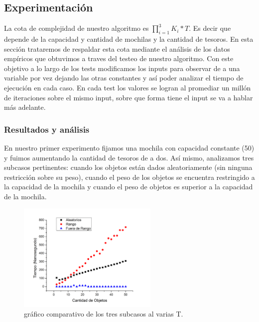 \documentclass[spanish,12pt]{article}
\begin{document}
\subsection{Experimentación}

La cota de complejidad de nuestro algoritmo es $\prod_{i=1}^{3}K_{i}* T$. Es decir que depende de la capacidad y cantidad de mochilas y la cantidad de tesoros.
En esta sección trataremos de respaldar esta cota mediante el análisis de los datos empíricos que obtuvimos a traves del testeo de nuestro algoritmo.
Con este objetivo a lo largo de los tests modificamos los inputs para observar de a una variable por vez dejando las otras constantes y así poder analizar el tiempo de ejecución en cada caso. En cada test los valores se logran al promediar un millón de iteraciones sobre el mismo input, sobre que forma tiene el input se va a hablar más adelante.

\subsubsection{Resultados y análisis}

En nuestro primer experimento fijamos una mochila con capacidad constante (50) y fuimos aumentando la cantidad de tesoros de a dos.
Así mismo, analizamos tres subcasos pertinentes: cuando los objetos están dados aleatoriamente (sin ninguna restricción sobre su peso), cuando el peso de los objetos se encuentra restringido a la capacidad de la mochila y cuando el peso de objetos es superior a la capacidad de la mochila.

\begin{figure}[H]
\centering
\includegraphics[width=0.6\textwidth]{comparacionObjetos}
\caption{gráfico comparativo de los tres subcasos al varias T.}
\end{figure}
\end{document}
